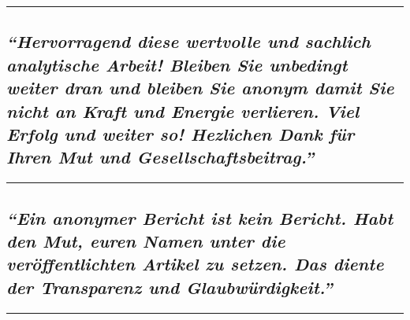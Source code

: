 \begin{center}\rule{0.5\linewidth}{\linethickness}\end{center}

\hypertarget{hervorragend-diese-wertvolle-und-sachlich-analytische-arbeit-bleiben-sie-unbedingt-weiter-dran-und-bleiben-sie-anonym-damit-sie-nicht-an-kraft-und-energie-verlieren-viel-erfolg-und-weiter-so-hezlichen-dank-fuxfcr-ihren-mut-und-gesellschaftsbeitrag}{%
\subsection{\texorpdfstring{\emph{``Hervorragend diese wertvolle und
sachlich analytische Arbeit! Bleiben Sie unbedingt weiter dran und
bleiben Sie anonym damit Sie nicht an Kraft und Energie verlieren. Viel
Erfolg und weiter so! Hezlichen Dank für Ihren Mut und
Gesellschaftsbeitrag.''}}{``Hervorragend diese wertvolle und sachlich analytische Arbeit! Bleiben Sie unbedingt weiter dran und bleiben Sie anonym damit Sie nicht an Kraft und Energie verlieren. Viel Erfolg und weiter so! Hezlichen Dank für Ihren Mut und Gesellschaftsbeitrag.''}}\label{hervorragend-diese-wertvolle-und-sachlich-analytische-arbeit-bleiben-sie-unbedingt-weiter-dran-und-bleiben-sie-anonym-damit-sie-nicht-an-kraft-und-energie-verlieren-viel-erfolg-und-weiter-so-hezlichen-dank-fuxfcr-ihren-mut-und-gesellschaftsbeitrag}}

\begin{center}\rule{0.5\linewidth}{\linethickness}\end{center}

\hypertarget{ein-anonymer-bericht-ist-kein-bericht-habt-den-mut-euren-namen-unter-die-veruxf6ffentlichten-artikel-zu-setzen-das-diente-der-transparenz-und-glaubwuxfcrdigkeit}{%
\subsection{\texorpdfstring{\emph{``Ein anonymer Bericht ist kein
Bericht. Habt den Mut, euren Namen unter die veröffentlichten Artikel zu
setzen. Das diente der Transparenz und
Glaubwürdigkeit.''}}{``Ein anonymer Bericht ist kein Bericht. Habt den Mut, euren Namen unter die veröffentlichten Artikel zu setzen. Das diente der Transparenz und Glaubwürdigkeit.''}}\label{ein-anonymer-bericht-ist-kein-bericht-habt-den-mut-euren-namen-unter-die-veruxf6ffentlichten-artikel-zu-setzen-das-diente-der-transparenz-und-glaubwuxfcrdigkeit}}

\begin{center}\rule{0.5\linewidth}{\linethickness}\end{center}

